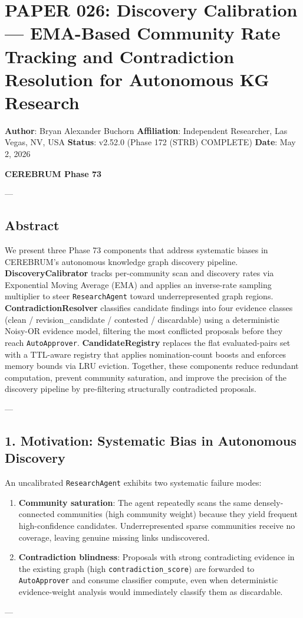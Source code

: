 \section{PAPER 026: Discovery Calibration — EMA-Based Community Rate Tracking and Contra\-diction Resolution for Autonomous KG Research}

\textbf{Author}: Bryan Alexander Buchorn  
\textbf{Affiliation}: Independent Researcher, Las Vegas, NV, USA  
\textbf{Status}: v2.52.0 (Phase 172 (STRB) COMPLETE)
\textbf{Date}: May 2, 2026

\textbf{CEREBRUM Phase 73}

---

\subsection{Abstract}

We present three Phase 73 components that address systematic biases in CEREBRUM's autonomous knowledge graph discovery pipeline. \textbf{DiscoveryCalibrator} tracks per-community scan and discovery rates via Exponential Moving Average (EMA) and applies an inverse-rate sampling multiplier to steer \texttt{ResearchAgent} toward under\-represented graph regions. \textbf{Contra\-dictionResolver} classifies candidate findings into four evidence classes (clean / revision\_candidate / contested / discardable) using a deter\-ministic Noisy-OR evidence model, filtering the most conflicted proposals before they reach \texttt{AutoApprover}. \textbf{CandidateRegistry} replaces the flat evaluated-pairs set with a TTL-aware registry that applies nomination-count boosts and enforces memory bounds via LRU eviction. Together, these components reduce redundant computation, prevent community saturation, and improve the precision of the discovery pipeline by pre-filtering struc\-turally contr\-adicted proposals.

---

\subsection{1. Motivation: Systematic Bias in Autonomous Discovery}

An uncal\-ibrated \texttt{ResearchAgent} exhibits two systematic failure modes:

\begin{enumerate}
\item \textbf{Community saturation}: The agent repeatedly scans the same densely-connected communities (high community weight) because they yield frequent high-confidence candidates. Underr\-epresented sparse communities receive no coverage, leaving genuine missing links undis\-covered.

\item \textbf{Contra\-diction blindness}: Proposals with strong contr\-adicting evidence in the existing graph (high \texttt{contradiction\_score}) are forwarded to \texttt{AutoApprover} and consume classifier compute, even when deter\-ministic evidence-weight analysis would immediately classify them as discardable.

\end{enumerate}
---

